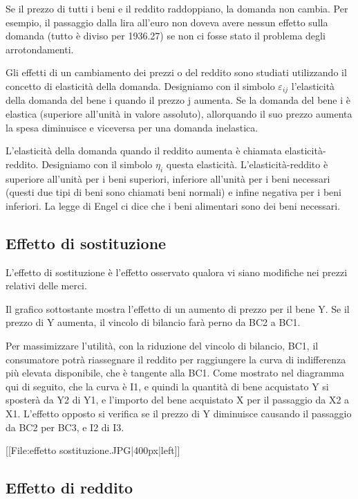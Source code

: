 Se il prezzo di tutti i beni e il reddito raddoppiano, la domanda non cambia. 
Per esempio, il passaggio dalla lira all'euro non doveva avere nessun effetto 
sulla domanda (tutto è diviso per 1936.27) se non ci fosse stato il problema 
degli arrotondamenti.

Gli effetti di un cambiamento dei prezzi o del reddito sono studiati 
utilizzando il concetto di elasticità della domanda. 
Designiamo con il simbolo \( \varepsilon_{ij}\) l'elasticità della domanda del 
bene i quando il prezzo j aumenta. 
Se la domanda del bene i è elastica (superiore all'unità in valore 
assoluto), allorquando il suo prezzo aumenta la spesa diminuisce e viceversa 
per una domanda inelastica.

L'elasticità della domanda quando il reddito aumenta è chiamata 
elasticità-reddito. Designiamo con il simbolo \( \eta_i \) questa 
elasticità. L'elasticità-reddito è superiore all'unità per i beni superiori, 
inferiore all'unità per i beni necessari (questi due tipi di beni sono chiamati 
beni normali) e infine negativa per i beni inferiori. La legge di Engel ci 
dice che i beni alimentari sono dei beni necessari.

\subsection{Effetto di sostituzione}

L'effetto di sostituzione è l'effetto osservato qualora vi siano modifiche nei 
prezzi relativi delle merci.

Il grafico sottostante mostra l'effetto di un aumento di prezzo per il bene Y. 
Se il prezzo di Y aumenta, il vincolo di bilancio farà perno da BC2 a BC1. 

Per massimizzare l'utilità, con la riduzione del vincolo di bilancio, BC1, il 
consumatore potrà riassegnare il reddito per raggiungere la curva di 
indifferenza più elevata disponibile, che è tangente alla BC1. Come mostrato 
nel diagramma qui di seguito, che la curva è I1, e quindi la quantità di bene 
acquistato Y si sposterà da Y2 di Y1, e l'importo del bene acquistato X per il 
passaggio da X2 a X1. L'effetto opposto si verifica se il prezzo di Y 
diminuisce causando il passaggio da BC2 per BC3, e I2 di I3. 

[[File:effetto sostituzione.JPG|400px|left]]


\subsection{Effetto di reddito}


